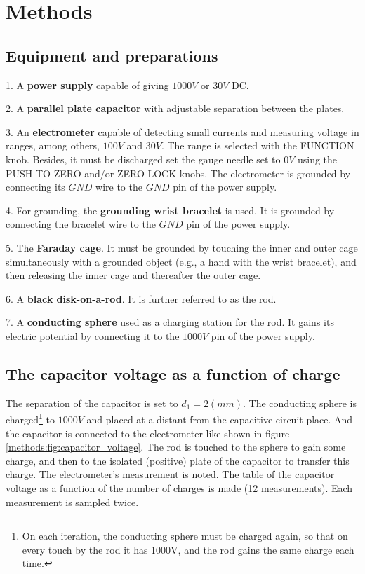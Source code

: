 \section{Methods}

\subsection{Equipment and preparations}

1. A \textbf{power supply} capable of giving $1000V$ or $30V$ DC.

2. A \textbf{parallel plate capacitor} with adjustable separation between the plates.

3. An \textbf{electrometer} capable of detecting small currents and measuring voltage in ranges, among others, $100V$ and $30V$. The range is selected with the FUNCTION knob. Besides, it must be discharged set the gauge needle set to $0V$ using the PUSH TO ZERO and/or ZERO LOCK knobs. The electrometer is grounded by connecting its $GND$ wire to the $GND$ pin of the power supply.

4. For grounding, the \textbf{grounding wrist bracelet} is used. It is grounded by connecting the bracelet wire to the $GND$ pin of the power supply.

5. The \textbf{Faraday cage}. It must be grounded by touching the inner and outer cage simultaneously with a grounded object (e.g., a hand with the wrist bracelet), and then releasing the inner cage and thereafter the outer cage.

6. A \textbf{black disk-on-a-rod}. It is further referred to as the rod.

7. A \textbf{conducting sphere} used as a charging station for the rod. It gains its electric potential by connecting it to the $1000V$ pin of the power supply.

\subsection{The capacitor voltage as a function of charge}

The separation of the capacitor is set to $d_{1} = 2 (mm)$. The conducting sphere is charged\footnote{On each iteration, the conducting sphere must be charged again, so that on every touch by the rod it has 1000V, and the rod gains the same charge each time.} to $1000V$ and placed at a distant from the capacitive circuit place. And the capacitor is connected to the electrometer like shown in figure \ref{methods:fig:capacitor_voltage}. The rod is touched to the sphere to gain some charge, and then to the isolated (positive) plate of the capacitor to transfer this charge. The electrometer's measurement is noted. The table of the capacitor voltage as a function of the number of charges is made (12 measurements). Each measurement is sampled twice.  

